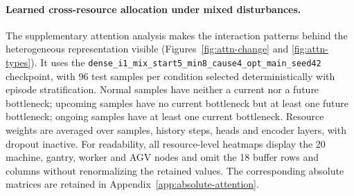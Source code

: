 \paragraph*{Learned cross-resource allocation under mixed disturbances.}
The supplementary attention analysis makes the interaction patterns behind the heterogeneous representation visible (Figures~\ref{fig:attn-change} and \ref{fig:attn-types}). It uses the \texttt{dense\_i1\_mix\_start5\_min8\_cause4\_opt\_main\_seed42} checkpoint, with 96 test samples per condition selected deterministically with episode stratification. Normal samples have neither a current nor a future bottleneck; upcoming samples have no current bottleneck but at least one future bottleneck; ongoing samples have at least one current bottleneck. Resource weights are averaged over samples, history steps, heads and encoder layers, with dropout inactive. For readability, all resource-level heatmaps display the 20 machine, gantry, worker and AGV nodes and omit the 18 buffer rows and columns without renormalizing the retained values. The corresponding absolute matrices are retained in Appendix~\ref{app:absolute-attention}.

